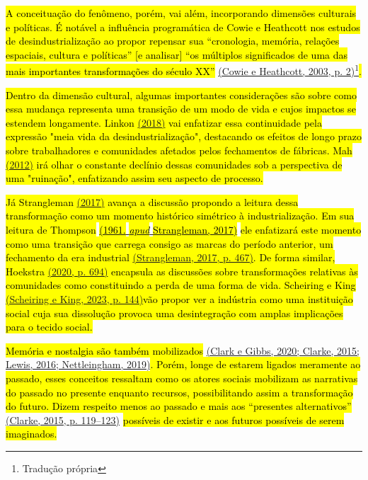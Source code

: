 \hl{A conceituação do fenômeno, porém, vai além, incorporando dimensões
culturais e políticas. É notável a influência programática de Cowie e
Heathcott nos estudos de desindustrialização ao propor repensar sua
``cronologia, memória, relações espaciais, cultura e políticas'' {[}e
analisar{]} ``os múltiplos significados de uma das mais importantes
transformações do século XX''}
\href{https://www.zotero.org/google-docs/?OCJTFh}{(Cowie e Heathcott,
2003, p. 2)}\footnote{Tradução própria}\hl{.}

\hl{Dentro da dimensão cultural, algumas importantes considerações são
sobre como essa mudança representa uma transição de um modo de vida e
cujos impactos se estendem longamente. Linkon
\href{https://www.zotero.org/google-docs/?NzkGTV}{(2018)} vai enfatizar
essa continuidade pela expressão "meia vida da desindustrialização",
destacando os efeitos de longo prazo sobre trabalhadores e comunidades
afetados pelos fechamentos de fábricas. Mah
\href{https://www.zotero.org/google-docs/?tI9fox}{(2012)} irá olhar o
constante declínio dessas comunidades sob a perspectiva de uma
"ruinação", enfatizando assim seu aspecto de processo.}

\hl{Já Strangleman
\href{https://www.zotero.org/google-docs/?AYbZdZ}{(2017)} avança a
discussão propondo a leitura dessa transformação como um momento
histórico simétrico à industrialização. Em sua leitura de Thompson}
\href{https://www.zotero.org/google-docs/?iE7wh2}{\hl{(1961.}
\emph{\hl{apud}} \hl{Strangleman, 2017)}} \hl{ele enfatizará este
momento como uma transição que carrega consigo as marcas do período
anterior, um fechamento da era industrial
\href{https://www.zotero.org/google-docs/?IjVSYR}{(Strangleman, 2017, p.
467)}. De forma similar, Hoekstra
\href{https://www.zotero.org/google-docs/?KIdYBO}{(2020, p. 694)}
encapsula as discussões sobre transformações relativas às comunidades
como constituindo a perda de uma forma de vida. Scheiring e King
\href{https://www.zotero.org/google-docs/?9kbgx1}{(Scheiring e King,
2023, p. 144)}vão propor ver a indústria como uma instituição social
cuja sua dissolução provoca uma desintegração com amplas implicações
para o tecido social.}

\hl{Memória e nostalgia são também mobilizados}
\href{https://www.zotero.org/google-docs/?Dc2GGA}{(Clark e Gibbs, 2020;
Clarke, 2015; Lewis, 2016; Nettleingham, 2019)}\hl{. Porém, longe de
estarem ligados meramente ao passado, esses conceitos ressaltam como os
atores sociais mobilizam as narrativas do passado no presente enquanto
recursos, possibilitando assim a transformação do futuro. Dizem respeito
menos ao passado e mais aos ``presentes alternativos''}
\href{https://www.zotero.org/google-docs/?clyMVg}{(Clarke, 2015, p.
119--123)} \hl{possíveis de existir e aos futuros possíveis de serem
imaginados.}

